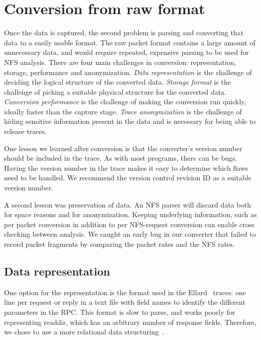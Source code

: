 \section{Conversion from raw format}
\label{sec:conversion}

Once the data is captured, the second problem is parsing and
converting that data to a easily usable format.  The raw packet format
contains a large amount of unnecessary data, and would require
repeated, expensive parsing to be used for NFS analysis.  There are four main
challenges in conversion: representation, storage, performance and
anonymization.  {\it Data representation} is the challenge of deciding the
logical structure of the converted data.  {\it Storage format} is the challenge of
picking a suitable physical structure for the converted data.
{\it Conversion performance} is the challenge of making the conversion run quickly,
ideally faster than the capture stage.  {\it Trace anonymization} is the
challenge of hiding sensitive information present in the data and is
necessary for being able to release traces.

One lesson we learned after conversion is that the converter's version
number should be included in the trace.  As with most programs, there
can be bugs.  Having the version number in the trace makes it easy to
determine which flaws need to be handled.  We recommend the version
control revision ID as a suitable version number.  

A second lesson was
preservation of data.  An NFS parser will discard data both for space
reasons and for anonymization.  Keeping underlying information, such as
per packet conversion in addition to per NFS-request conversion can
enable cross checking between analysis.  We caught an early bug in our
converter that failed to record packet fragments by comparing the
packet rates and the NFS rates.  

\subsection{Data representation}

One option for the representation is the format used in the
Ellard~\cite{ellardTraces} traces: one line per request or reply in a text
file with field names to identify the different parameters in the RPC.
This format is slow to parse, and works poorly for representing 
readdir, which has an arbitrary number of response fields.
Therefore, we chose to use a more relational data
structuring~\cite{codd70relational}.  

